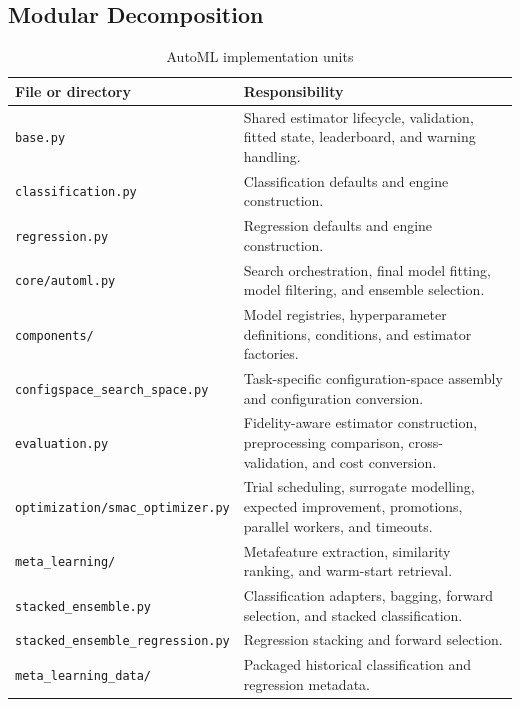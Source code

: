\documentclass[12pt,a4paper]{report}
\newcommand{\modulepath}[1]{\texttt{#1}}
\begin{document}
\subsection{Modular Decomposition}
\begin{table}[H]
\centering
\caption{AutoML implementation units}
\label{tab:automl_implementation_units}
\small
\renewcommand{\arraystretch}{1.15}
\begin{tabularx}{\textwidth}{>{\raggedright\arraybackslash}p{}X}
\toprule
\textbf{File or directory} & \textbf{Responsibility} \\
\midrule
\modulepath{base.py} & Shared estimator lifecycle, validation, fitted state,
leaderboard, and warning handling. \\
\modulepath{classification.py} & Classification defaults and engine
construction. \\
\modulepath{regression.py} & Regression defaults and engine construction. \\
\modulepath{core/automl.py} & Search orchestration, final model fitting, model
filtering, and ensemble selection. \\
\modulepath{components/} & Model registries, hyperparameter definitions,
conditions, and estimator factories. \\
\modulepath{configspace\_search\_space.py} & Task-specific configuration-space
assembly and configuration conversion. \\
\modulepath{evaluation.py} & Fidelity-aware estimator construction,
preprocessing comparison, cross-validation, and cost conversion. \\
\modulepath{optimization/smac\_optimizer.py} & Trial scheduling, surrogate
modelling, expected improvement, promotions, parallel workers, and timeouts. \\
\modulepath{meta\_learning/} & Metafeature extraction, similarity ranking, and
warm-start retrieval. \\
\modulepath{stacked\_ensemble.py} & Classification adapters, bagging, forward
selection, and stacked classification. \\
\modulepath{stacked\_ensemble\_regression.py} & Regression stacking and forward
selection. \\
\modulepath{meta\_learning\_data/} & Packaged historical classification and
regression metadata. \\
\bottomrule
\end{tabularx}
\end{table}
\end{document}

